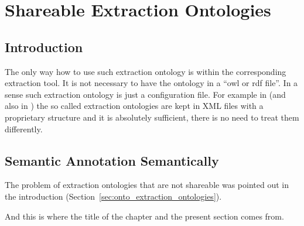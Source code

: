 \chapter{Shareable Extraction Ontologies} 

\graphicspath{{../img/ch70/}}



\section{Introduction} 

The only way how to use such extraction ontology is within the corresponding extraction tool. It is not necessary to have the ontology in a ``owl or rdf file''. In a sense such extraction ontology is just a configuration file. For example in \citep{springerlink:10.1007/978-3-642-01891-6_5} %
 (and also in \citep{DBLP:conf/er/EmbleyTL02}) the so called extraction ontologies are kept in XML files with a proprietary structure and it is absolutely sufficient, there is no need to treat them differently.









\section{Semantic Annotation Semantically} 

The problem of extraction ontologies that are not shareable was pointed out in the introduction (Section~\ref{sec:onto_extraction_ontologies}). 

And this is where the title of the chapter and the present section comes from. 










